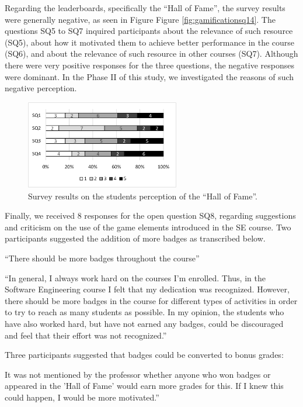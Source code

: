 Regarding the leaderboards, specifically the “Hall of Fame”, the survey results were generally negative, as seen in Figure Figure \ref{fig:gamificationsq14}. The questions SQ5 to SQ7 inquired participants about the relevance of such resource (SQ5), about how it motivated them to achieve better performance in the course (SQ6), and about the relevance of such resource in other courses (SQ7). Although there were very positive responses for the three questions, the negative responses were dominant. In the Phase II of this study, we investigated the reasons of such negative perception.

\begin{figure}[!h]%
\centering
\includegraphics[width = 0.6\textwidth]{img/gamificationSQ14.png}
\caption{Survey results on the students perception of the “Hall of Fame”.}
\label{fig:gamificationsq57}
\end{figure}


Finally, we received 8 responses for the open question SQ8, regarding suggestions and criticism on the use of the game elements introduced in the SE course. Two participants suggested the addition of more badges as transcribed below.

“There should be more badges throughout the course”

“In general, I always work hard on the courses I'm enrolled. Thus, in the Software Engineering course I felt that my dedication was recognized. However, there should be more badges in the course for different types of activities in order to try to reach as many students as possible. In my opinion, the students who have also worked hard, but have not earned any badges, could be discouraged and feel that their effort was not recognized.”

Three participants suggested that badges could be converted to bonus grades:

It was not mentioned by the professor whether anyone who won badges or appeared in the 'Hall of Fame' would earn more grades for this. If I knew this could happen, I would be more motivated.”

